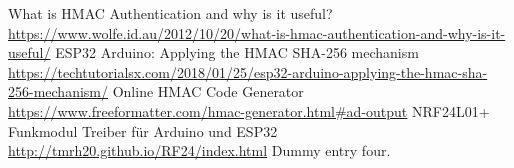 \documentclass[
  10pt, %
  a4paper, %
  twoside, %
  openright, %
  numbers=noenddot, %
  BCOR=5mm, %
  parskip=half*, %
  thesis, %
]{bfhbook}
\begin{document}
\listoffigures
\listoftables
\printglossary
\begin{thebibliography}{99}
    What is HMAC Authentication and why is it useful? \url{https://www.wolfe.id.au/2012/10/20/what-is-hmac-authentication-and-why-is-it-useful/}
     ESP32 Arduino: Applying the HMAC SHA-256 mechanism \url{https://techtutorialsx.com/2018/01/25/esp32-arduino-applying-the-hmac-sha-256-mechanism/}
     Online HMAC Code Generator \url{https://www.freeformatter.com/hmac-generator.html#ad-output}
     NRF24L01+ Funkmodul Treiber für Arduino und ESP32 \url{http://tmrh20.github.io/RF24/index.html}
     Dummy entry four.
  \end{thebibliography}
\end{document}
